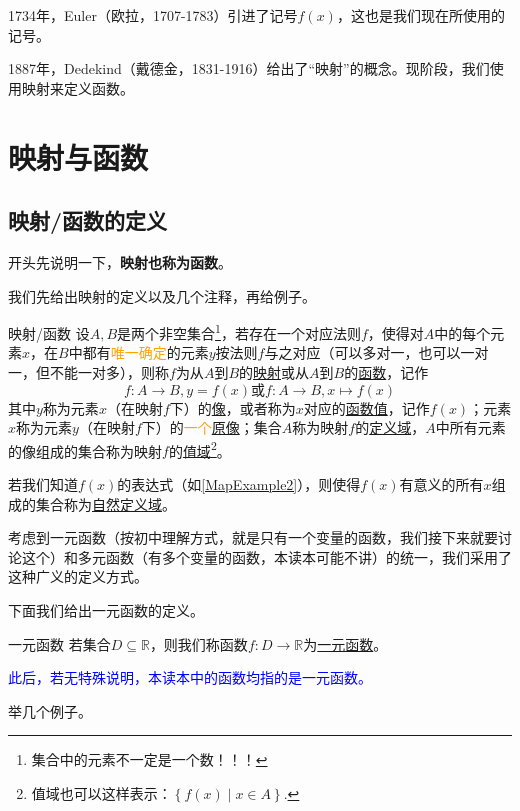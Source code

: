 \documentclass[lang=cn,math=cm,chinesefont=nofont,11pt,scheme=chinese,onecol]{elegantbook}
\begin{document}
1734年，Euler（欧拉，1707-1783）引进了记号$f(x)$，这也是我们现在所使用的记号。

1887年，Dedekind（戴德金，1831-1916）给出了“映射”的概念。现阶段，我们使用映射来定义函数。

\section{映射与函数}

\subsection{映射/函数的定义}

开头先说明一下，\textbf{映射也称为函数}。

我们先给出映射的定义以及几个注释，再给例子。

\begin{definition}{映射/函数}
  设$A,B$是两个非空集合\footnote{集合中的元素不一定是一个数！！！}，若存在一个对应法则$f$，使得对$A$中的每个元素$x$，在$B$中都有\textcolor{orange}{唯一确定}的元素$y$按法则$f$与之对应（可以多对一，也可以一对一，但不能一对多），则称$f$为从$A$到$B$的\underline{映射}或从$A$到$B$的\underline{函数}，记作$$f:A\rightarrow B,y=f(x)\text{或}f:A\rightarrow B,x\mapsto f(x)$$其中$y$称为元素$x$（在映射$f$下）的\underline{像}，或者称为$x$对应的\underline{函数值}，记作$f(x)$；元素$x$称为元素$y$（在映射$f$下）的\textcolor{orange}{一个}\underline{原像}；集合$A$称为映射$f$的\underline{定义域}，$A$中所有元素的像组成的集合称为映射$f$的\underline{值域}\footnote{值域也可以这样表示：$\left\{f(x)\mid x\in A\right\}.$}。

  若我们知道$f(x)$的表达式（如\ref{MapExample2}），则使得$f(x)$有意义的所有$x$组成的集合称为\underline{自然定义域}。
\end{definition}

考虑到一元函数（按初中理解方式，就是只有一个变量的函数，我们接下来就要讨论这个）和多元函数（有多个变量的函数，本读本可能不讲）的统一，我们采用了这种广义的定义方式。



下面我们给出一元函数的定义。

\begin{definition}{一元函数}
  若集合$D\subseteq \mathbb{R}$，则我们称函数$f:D\rightarrow\mathbb{R}$为\underline{一元函数}。
\end{definition}

\textcolor{blue}{此后，若无特殊说明，本读本中的函数均指的是一元函数。}

举几个例子。
\end{document}
